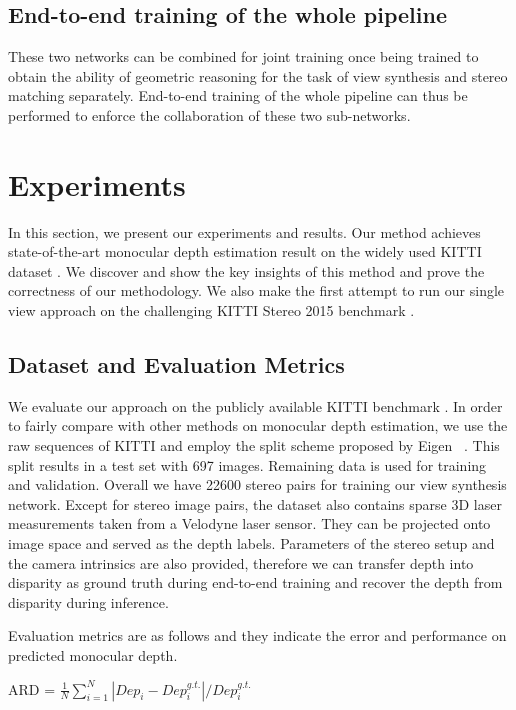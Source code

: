 \documentclass[10pt,twocolumn,letterpaper]{article}
\begin{document}
\subsection{End-to-end training of the whole pipeline}

These two networks can be combined for joint training once being trained to obtain the ability of geometric reasoning for the task of view synthesis and stereo matching separately. End-to-end training of the whole pipeline can thus be performed to enforce the collaboration of these two sub-networks.

\section{Experiments}
In this section, we present our experiments and results. Our method achieves state-of-the-art monocular depth estimation result on the widely used KITTI dataset \cite{Geiger2012CVPR}. We discover and show the key insights of this method and prove the correctness of our methodology. We also make the first attempt to run our single view approach on the challenging KITTI Stereo 2015 benchmark \cite{Menze2015CVPR}.

\subsection{Dataset and Evaluation Metrics}
We evaluate our approach on the publicly available KITTI benchmark \cite{Geiger2012CVPR}. In order to fairly compare with other methods on monocular depth estimation, we use the raw sequences of KITTI and employ the split scheme proposed by Eigen \etal~\cite{eigen2014depth}. This split results in a test set with 697 images. Remaining data is used for training and validation. Overall we have 22600 stereo pairs for training our view synthesis network. Except for stereo image pairs, the dataset also contains sparse 3D laser measurements taken from a Velodyne laser sensor. They can be projected onto image space and served as the depth labels. Parameters of the stereo setup and the camera intrinsics are also provided, therefore we can transfer depth into disparity as ground truth during end-to-end training and recover the depth from disparity during inference.

Evaluation metrics are as follows and they indicate the error and performance on predicted monocular depth.

ARD = $\frac{1}{N}\sum_{i=1}^N{\left|Dep_i - Dep_i^{g.t.}\right|}/{Dep_i^{g.t.}}$
\end{document}
